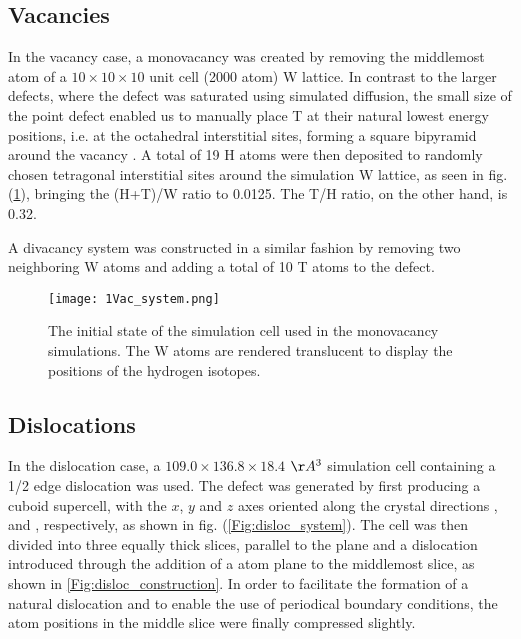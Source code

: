 \subsection{Vacancies}
In the vacancy case, a monovacancy was created by removing the middlemost atom of a $10\times 10 \times 10$ unit cell (2000 atom) W lattice.  
In contrast to the larger defects, where the defect was saturated using simulated diffusion, the small size of the point defect enabled us to manually place T at their natural lowest energy positions, i.e. at the octahedral interstitial sites, forming a square bipyramid around the vacancy \cite{heinolaTungstenDFT}.
A total of 19 H atoms were then deposited to randomly chosen tetragonal interstitial sites around the simulation W lattice, as seen in fig. (\ref{Fig:monovac_system}), bringing the (H+T)/W ratio to 0.0125. 
The T/H ratio, on the other hand, is 0.32.

A divacancy system was constructed in a similar fashion by removing two neighboring W atoms and adding a total of 10 T atoms to the defect.

\begin{figure}[!ht]
\center
\texttt{[image: 1Vac\_system.png]}
\caption{The initial state of the simulation cell used in the monovacancy simulations. 
The W atoms are rendered translucent to display the positions of the hydrogen isotopes.}
\label{Fig:monovac_system}
\end{figure}

\subsection{Dislocations}
In the dislocation case, a  $109.0 \times 136.8 \times 18.4$ $\AA^3$ simulation cell containing a 1/2\hkl[1 1 1] edge dislocation was used. 
The defect was generated by first producing a cuboid supercell, with the $x$, $y$ and $z$ axes oriented along the crystal directions \hkl[1 1 1], \hkl[1 1 -2] and \hkl[-1 1 0], respectively, as shown in fig. (\ref{Fig:disloc_system}). 
The cell was then divided into three equally thick slices, parallel to the  plane and a dislocation introduced through the addition of a  atom plane to the middlemost slice, as shown in \ref{Fig:disloc_construction}. 
In order to facilitate the formation of a natural dislocation and to enable the use of periodical boundary conditions, the atom positions in the middle slice were finally compressed slightly.

